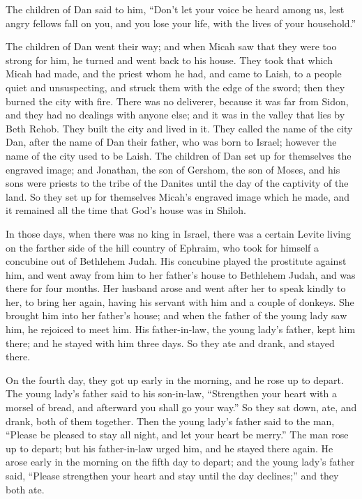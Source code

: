 \myverse{}The children of Dan said to him, “Don’t let your voice be heard
among us, lest angry fellows fall on you, and you lose your life, with the lives of your household.”

\myverse{}The children of Dan went their way; and when Micah saw that
they were too strong for him, he turned and went back to his house.
\myverse{}They took that which Micah had made, and the priest whom he had, and came
to Laish, to a people quiet and unsuspecting, and struck them with the edge of the sword; then they burned
the city with fire.
\myverse{}There was no deliverer, because it was far from Sidon, and they had no dealings
with anyone else; and it was in the valley that lies by Beth Rehob. They built the city and lived in it.
\myverse{}They called the name of the city Dan, after the name of Dan their father,
who was born to Israel; however the name of the city used to be Laish.
\myverse{}The children of Dan set up for themselves the engraved image; and Jonathan,
the son of Gershom, the son of Moses, and his sons were priests to the tribe of the Danites until the
day of the captivity of the land.
\myverse{}So they set up for themselves Micah’s engraved image which he made, and it
remained all the time that God’s house was in Shiloh.


\mychapter{} \myverse*{}In those days, when there was no king in Israel, there was a certain
Levite living on the farther side of the hill country of Ephraim, who took for himself a concubine out
of Bethlehem Judah.
\myverse{}His concubine played the prostitute against him, and went away from him to
her father’s house to Bethlehem Judah, and was there for four months.
\myverse{}Her husband arose and went after her to speak kindly to her, to bring her again,
having his servant with him and a couple of donkeys. She brought him into her father’s house; and when
the father of the young lady saw him, he rejoiced to meet him.
\myverse{}His father-in-law, the young lady’s father, kept him there; and he stayed with
him three days. So they ate and drank, and stayed there.

\myverse{}On the fourth day, they got up early in the morning, and he rose
up to depart. The young lady’s father said to his son-in-law, “Strengthen your heart with a morsel of
bread, and afterward you shall go your way.”
\myverse{}So they sat down, ate, and drank, both of them together. Then the young lady’s
father said to the man, “Please be pleased to stay all night, and let your heart be merry.”
\myverse{}The man rose up to depart; but his father-in-law urged him, and he stayed there
again.
\myverse{}He arose early in the morning on the fifth day to depart; and the young lady’s
father said, “Please strengthen your heart and stay until the day declines;” and they both ate.

